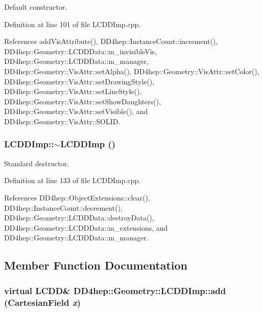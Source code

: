Default constructor. 

Definition at line 101 of file LCDDImp.cpp.

References addVisAttribute(), DD4hep::InstanceCount::increment(), DD4hep::Geometry::LCDDData::m\_\-invisibleVis, DD4hep::Geometry::LCDDData::m\_\-manager, DD4hep::Geometry::VisAttr::setAlpha(), DD4hep::Geometry::VisAttr::setColor(), DD4hep::Geometry::VisAttr::setDrawingStyle(), DD4hep::Geometry::VisAttr::setLineStyle(), DD4hep::Geometry::VisAttr::setShowDaughters(), DD4hep::Geometry::VisAttr::setVisible(), and DD4hep::Geometry::VisAttr::SOLID.\hypertarget{class_d_d4hep_1_1_geometry_1_1_l_c_d_d_imp_a75a7b388970a2f18f79a8eddbc451411}{
\subsubsection[{$\sim$LCDDImp}]{\setlength{\rightskip}{0pt plus 5cm}LCDDImp::$\sim$LCDDImp ()}}
\label{class_d_d4hep_1_1_geometry_1_1_l_c_d_d_imp_a75a7b388970a2f18f79a8eddbc451411}


Standard destructor. 

Definition at line 133 of file LCDDImp.cpp.

References DD4hep::ObjectExtensions::clear(), DD4hep::InstanceCount::decrement(), DD4hep::Geometry::LCDDData::destroyData(), DD4hep::Geometry::LCDDData::m\_\-extensions, and DD4hep::Geometry::LCDDData::m\_\-manager.

\subsection{Member Function Documentation}
\hypertarget{class_d_d4hep_1_1_geometry_1_1_l_c_d_d_imp_aefc75f3c9c031176d3d3e5eafe091716}{
\subsubsection[{add}]{\setlength{\rightskip}{0pt plus 5cm}virtual {\bf LCDD}\& DD4hep::Geometry::LCDDImp::add ({\bf CartesianField} {\em x})}}
\label{class_d_d4hep_1_1_geometry_1_1_l_c_d_d_imp_aefc75f3c9c031176d3d3e5eafe091716}


